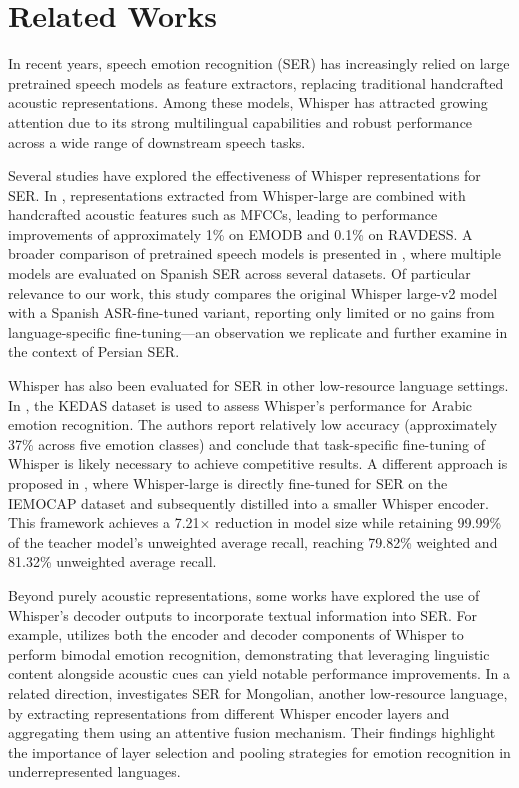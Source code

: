 \documentclass[conference]{IEEEtran}
\begin{document}
\section{Related Works}
In recent years, speech emotion recognition (SER) has increasingly relied on large pretrained speech models as feature extractors, replacing traditional handcrafted acoustic representations. Among these models, Whisper has attracted growing attention due to its strong multilingual capabilities and robust performance across a wide range of downstream speech tasks.

Several studies have explored the effectiveness of Whisper representations for SER. In \cite{b1}, representations extracted from Whisper-large are combined with handcrafted acoustic features such as MFCCs, leading to performance improvements of approximately 1\% on EMODB and 0.1\% on RAVDESS. A broader comparison of pretrained speech models is presented in \cite{b3}, where multiple models are evaluated on Spanish SER across several datasets. Of particular relevance to our work, this study compares the original Whisper large-v2 model with a Spanish ASR-fine-tuned variant, reporting only limited or no gains from language-specific fine-tuning—an observation we replicate and further examine in the context of Persian SER.

Whisper has also been evaluated for SER in other low-resource language settings. In \cite{b4}, the KEDAS dataset is used to assess Whisper’s performance for Arabic emotion recognition. The authors report relatively low accuracy (approximately 37\% across five emotion classes) and conclude that task-specific fine-tuning of Whisper is likely necessary to achieve competitive results. A different approach is proposed in \cite{b5}, where Whisper-large is directly fine-tuned for SER on the IEMOCAP dataset and subsequently distilled into a smaller Whisper encoder. This framework achieves a 7.21$\times$ reduction in model size while retaining 99.99\% of the teacher model’s unweighted average recall, reaching 79.82\% weighted and 81.32\% unweighted average recall.

Beyond purely acoustic representations, some works have explored the use of Whisper’s decoder outputs to incorporate textual information into SER. For example, \cite{b7} utilizes both the encoder and decoder components of Whisper to perform bimodal emotion recognition, demonstrating that leveraging linguistic content alongside acoustic cues can yield notable performance improvements. In a related direction, \cite{b8} investigates SER for Mongolian, another low-resource language, by extracting representations from different Whisper encoder layers and aggregating them using an attentive fusion mechanism. Their findings highlight the importance of layer selection and pooling strategies for emotion recognition in underrepresented languages.
\end{document}
